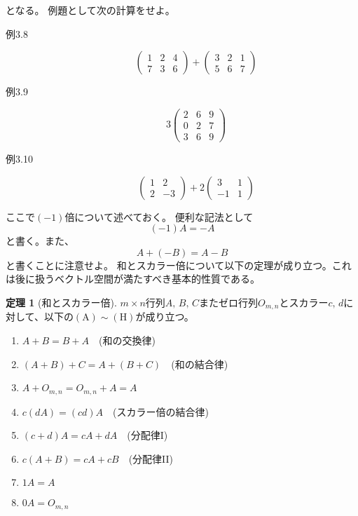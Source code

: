 \documentclass[10pt]{jsreport}
\theoremstyle{definition}%
\newtheorem{thm}{定理}[section]%
\numberwithin{equation}{section}%
\begin{document}
となる。
例題として次の計算をせよ。
\begin{description}
  \item[例3.8] 
  \begin{equation}
    \left(  
      \begin{matrix}
        1 & 2 & 4 \\
        7 & 3 & 6
      \end{matrix}
    \right)+\left(  
      \begin{matrix}
        3 & 2 & 1 \\
        5 & 6 & 7
      \end{matrix}
    \right)
  \end{equation}
  \item[例3.9] 
  \begin{equation}
   3 \left( 
      \begin{matrix}
        2 & 6 & 9 \\
        0 & 2 & 7  \\
        3 & 6 & 9 
      \end{matrix}
    \right)
  \end{equation}
  \item[例3.10] \begin{equation}
    \left(  
      \begin{matrix}
        1 & 2  \\
        2 & -3 
      \end{matrix}
    \right)+ 2 \left(  
      \begin{matrix}
        3 & 1 \\
        -1 & 1 
      \end{matrix}
    \right)
  \end{equation}
\end{description}
ここで$(-1)$倍について述べておく。
便利な記法として
\begin{equation}
  (-1)A=-A
\end{equation}
と書く。また、
\begin{equation}
  A+(-B)=A-B
\end{equation}
と書くことに注意せよ。
和とスカラー倍について以下の定理が成り立つ。これは後に扱うベクトル空間が満たすべき基本的性質である。
\begin{screen}
  \begin{thm}[和とスカラー倍]
  $m\times n$行列$A,\, B,\, C$またゼロ行列$O_{m,n}$とスカラー$c, \, d$に対して、以下の$(\mathrm{A})\sim (\mathrm{H})$が成り立つ。
  \begin{enumerate}
    \item  $A+B=B+A\quad $(和の交換律)
    \item  $(A+B)+C=A+(B+C)\quad $(和の結合律)
    \item $A+O_{m,n}=O_{m,n}+A=A$
    \item $c(dA)=(cd)A\quad $(スカラー倍の結合律)
    \item $(c+d)A=cA+dA \quad $(分配律I)
    \item $c(A+B)=cA+cB \quad $(分配律II)
    \item $1A=A$
    \item $0A=O_{m,n}$
  \end{enumerate}
  \end{thm}
\end{screen}
\end{document}
